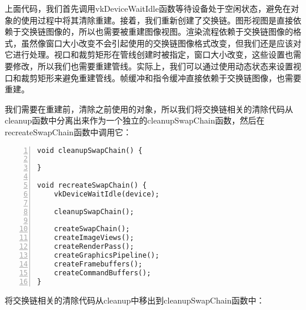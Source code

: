 \documentclass{ctexart}
\begin{document}
上面代码，我们首先调用vkDeviceWaitIdle函数等待设备处于空闲状态，避免在对象的使用过程中将其清除重建。接着，我们重新创建了交换链。图形视图是直接依赖于交换链图像的，所以也需要被重建图像视图。渲染流程依赖于交换链图像的格式，虽然像窗口大小改变不会引起使用的交换链图像格式改变，但我们还是应该对它进行处理。视口和裁剪矩形在管线创建时被指定，窗口大小改变，这些设置也需要修改，所以我们也需要重建管线。实际上，我们可以通过使用动态状态来设置视口和裁剪矩形来避免重建管线。帧缓冲和指令缓冲直接依赖于交换链图像，也需要重建。

我们需要在重建前，清除之前使用的对象，所以我们将交换链相关的清除代码从cleanup函数中分离出来作为一个独立的cleanupSwapChain函数，然后在recreateSwapChain函数中调用它：

\begin{lstlisting}[language={[ANSI]C},keywordstyle=\color{blue!70},commentstyle=\color{red!50!green!50!blue!50},frame=shadowbox, rulesepcolor=\color{red!20!green!20!blue!20},basicstyle=\small,numbers=left, numberstyle=\tiny,breaklines=true]
void cleanupSwapChain() {

}

void recreateSwapChain() {
	vkDeviceWaitIdle(device);

	cleanupSwapChain();

	createSwapChain();
	createImageViews();
	createRenderPass();
	createGraphicsPipeline();
	createFramebuffers();
	createCommandBuffers();
}
\end{lstlisting}

将交换链相关的清除代码从cleanup中移出到cleanupSwapChain函数中：
\end{document}
